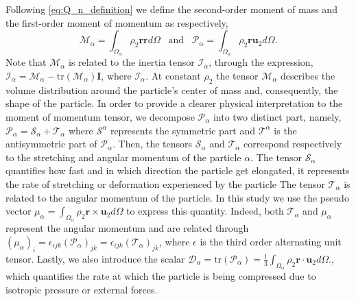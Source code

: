Following \ref{eq:Q_n_definition} we define the second-order moment of mass and the first-order moment of momentum as respectively,
\begin{equation}
    \mathcal{M}_\alpha 
    = \int_{\Omega_\alpha} \rho_2 \textbf{r} \textbf{r} d\Omega
    \;\;\;\text{and}\;\;\;
    \mathcal{P}_\alpha 
    = \int_{\Omega_\alpha} \rho_2 \textbf{r} \textbf{u}_2 d\Omega.
    \label{eq:first_moment_of_momentum_def}
\end{equation}
Note that $\mathcal{M}_\alpha$ is related to the inertia tensor $\mathcal{I}_\alpha$, through the expression, $\mathcal{I}_\alpha = \mathcal{M}_\alpha - \text{tr}(\mathcal{M}_\alpha)\textbf{I}$,
where $\mathcal{I}_\alpha$. 
At constant $\rho_2$ the tensor $\mathcal{M}_\alpha$ describes the volume distribution around the particle's center of mass and, consequently, the shape of the particle.
In order to provide a clearer physical interpretation to the moment of momentum tensor, we decompose $\mathcal{P}_\alpha$ into two distinct part, namely,
$\mathcal{P}_\alpha = \mathcal{S}_\alpha+\mathcal{T}_\alpha$ where $\mathcal{S}^\alpha$ represents the symmetric part and $\mathcal{T}^\alpha$ is the antisymmetric part of $\mathcal{P}_\alpha$.
Then, the tensors $\mathcal{S}_\alpha$ and $\mathcal{T}_\alpha$ correspond respectively to the stretching and angular momentum of the particle $\alpha$. 
The tensor $\mathcal{S}_\alpha$ quantifies how fast and in which direction the particle get elongated, it represents the rate of stretching or deformation experienced by the particle
The tensor $\mathcal{T}_\alpha$ is related to the angular momentum of the particle. 
In this study we use the pseudo vector $\mu_\alpha = \int_{\Omega_\alpha} \rho_2 \textbf{r} \times \textbf{u}_2 d\Omega$ to express this quantity. 
Indeed, both  $\mathcal{T}_\alpha$ and $\mu_\alpha$ represent the angular momentum and are related through $(\mu_\alpha)_i = \epsilon_{ijk} (\mathcal{P}_\alpha)_{jk}= \epsilon_{ijk} (\mathcal{T}_\alpha)_{jk}$, where $\epsilon$ is the third order alternating unit tensor. 
Lastly, we also introduce the scalar $\mathcal{D}_\alpha = \text{tr}(\mathcal{P}_\alpha) = \frac{1}{3}\int_{\Omega_\alpha} \rho_2 \textbf{r} \cdot \textbf{u}_2 d\Omega.$, which quantifies the rate at which the particle is being compressed due to isotropic pressure or external forces.


